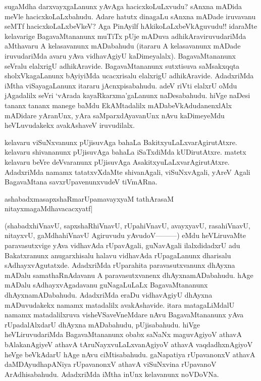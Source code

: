 sugaMdha darxvayxgaLanunx yAvAga hacicxkoLuLxvudu? sAnxna mADida meVle hacicxkoLaLxbahudu. Adare hatutx dinagaLu sAnxna mADade iruvavanu seMTf hacicxkoLaLxbeVkeV? Aga PinAyilf hAkikoLaLxbeVkAguvudu!! idaraMte kelavarige BagavaMtananunx muTiTx pUje mADuva adhikAraviruvudariMda aMthavaru A kelasavanunx mADabahudu (itararu A kelasavanunx mADade iruvudariMda avaru yAva vidhavAgiyU kaDimeyalalx). BagavaMtananunx seVralu elalxrigU adhikAravide. BagavaMtananunx sutxtisuva saMsakxqqta sholxVkagaLanunx bAyiyiMda ucacxrisalu elalxrigU adhikAravide. AdadxriMda iMtha viSayagaLanunx itararu jAcnxpisabahudu. adeV riVti elalxrU oMdu jAgadalilx seVri `vArada kayaRkarxma'gaLanunx naDesabahudu. hiVge naDesi tananx tananx manege baMdu EkAMtadalilx mADabeVkAdudanenxlAlx mADidare yAranUnx, yAra saMparxdAyavanUnx nAvu kaDimeyeMdu heVLuvudakekx avakAshaveV iruvudilalx.

kelavaru viSuNxvanunx pUjisuvAga bahaLa BakitxyuLaLxvarAgirutAtxre. 
kelavaru shivananunx pUjisuvAga bahaLa iSaTxdiMda kUDirutAtxre. matetx 
kelavaru beVre deVvaranunx pUjisuvAga AsakitxyuLaLxvarAgirutAtxre. 
AdadxriMda namamx tatatxvXdaMte shivanAgali, viSuNxvAgali, yAreV Agali 
BagavaMtana savxrUpavenunxvudeV tiVmARna.

\begin{shloka}
ashabadxmasapxshaRmarUpamavayxyaM tathA\s rasaM 
nitayxmagaMdhavacacxyatf|\\
\end{shloka}

(shabadxhiVnavU, sapxshaRhiVnavU, rUpahiVnavU, avayxyavU, rasahiVnavU, nitayxvU, gaMdhahiVnavU Agiruvudu yAvudoV---------) eMdu heVLiruvaMte paravasutxvige yAva vidhavAda rUpavAgali, guNavAgali ilalxdidadxrU adu Bakatxranunx anugarxhisalu halavu vidhavAda rUpagaLanunx dharisalu sAdhayxvAgutatxde. AdadxriMda rUparahita paravasutxvanunx dhAyxna mADalu samathaRnAdavanu A paravasutxvanenx dhAyxnamADabahudu. hAge mADalu sAdhayxvAgadavanu guNagaLuLaLx BagavaMtananunx dhAyxnamADabahudu. AdadxriMda eraDu vidhavAgiyU dhAyxna mADuvudakekx namamx matadalilx avakAshavide. itara matagaLiMdalU namamx matadalilxruva visheVSaveVneMdare nAvu BagavaMtananunx yAva rUpadalAlxdarU dhAyxna mADabahudu, pUjisabahudu. hiVge heVLiruvudariMda BagavaMtananunx obabx saNaNx maguvAgiyoV athavA bAlakanAgiyeV athavA tAruNayxvuLaLxvanAgiyoV athavA vaqdadhxnAgiyoV heVge beVkAdarU hAge nAvu ciMtisabahudu. gaNapatiya rUpavanonxV athavA daMDAyudhapANiya rUpavanonxV athavA viSuNxvina rUpavanoV ArAdhisabahudu. AdadxriMda iMtha inUnx kelavanunx noVDoVNa.

